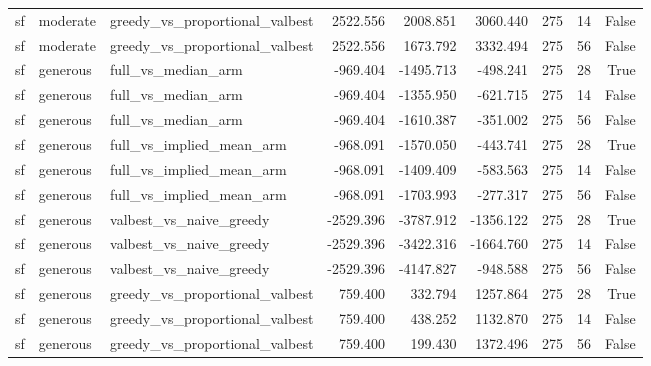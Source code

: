 \begin{tabular}{lllrrrrrr}
sf & moderate & greedy\_vs\_proportional\_valbest & 2522.556 & 2008.851 & 3060.440 & 275 & 14 & False \\
sf & moderate & greedy\_vs\_proportional\_valbest & 2522.556 & 1673.792 & 3332.494 & 275 & 56 & False \\
sf & generous & full\_vs\_median\_arm & -969.404 & -1495.713 & -498.241 & 275 & 28 & True \\
sf & generous & full\_vs\_median\_arm & -969.404 & -1355.950 & -621.715 & 275 & 14 & False \\
sf & generous & full\_vs\_median\_arm & -969.404 & -1610.387 & -351.002 & 275 & 56 & False \\
sf & generous & full\_vs\_implied\_mean\_arm & -968.091 & -1570.050 & -443.741 & 275 & 28 & True \\
sf & generous & full\_vs\_implied\_mean\_arm & -968.091 & -1409.409 & -583.563 & 275 & 14 & False \\
sf & generous & full\_vs\_implied\_mean\_arm & -968.091 & -1703.993 & -277.317 & 275 & 56 & False \\
sf & generous & valbest\_vs\_naive\_greedy & -2529.396 & -3787.912 & -1356.122 & 275 & 28 & True \\
sf & generous & valbest\_vs\_naive\_greedy & -2529.396 & -3422.316 & -1664.760 & 275 & 14 & False \\
sf & generous & valbest\_vs\_naive\_greedy & -2529.396 & -4147.827 & -948.588 & 275 & 56 & False \\
sf & generous & greedy\_vs\_proportional\_valbest & 759.400 & 332.794 & 1257.864 & 275 & 28 & True \\
sf & generous & greedy\_vs\_proportional\_valbest & 759.400 & 438.252 & 1132.870 & 275 & 14 & False \\
sf & generous & greedy\_vs\_proportional\_valbest & 759.400 & 199.430 & 1372.496 & 275 & 56 & False \\
\bottomrule
\end{tabular}
